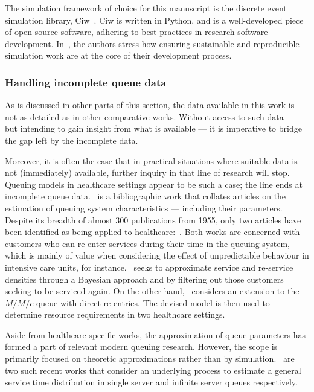 \documentclass[]{interact}
\theoremstyle{plain}%
\theoremstyle{definition}
\theoremstyle{remark}
\begin{document}
The simulation framework of choice for this manuscript is the discrete event
simulation library, Ciw~\citep{Palmer2019}. Ciw is written in Python, and is a
well-developed piece of open-source software, adhering to best practices in
research software development. In~\cite{Palmer2019}, the authors stress how
ensuring sustainable and reproducible simulation work are at the core of their
development process.

\subsubsection{Handling incomplete queue data}

As is discussed in other parts of this section, the data available in this work
is not as detailed as in other comparative works. Without access to such data
--- but intending to gain insight from what is available --- it is
imperative to bridge the gap left by the incomplete data.

Moreover, it is often the case that in practical situations where suitable data
is not (immediately) available, further inquiry in that line of research will
stop. Queuing models in healthcare settings appear to be such a case; the line
ends at incomplete queue data.~\cite{Asanjarani2017} is a bibliographic work
that collates articles on the estimation of queuing system characteristics ---
including their parameters. Despite its breadth of almost 300 publications from
1955, only two articles have been identified as being applied to
healthcare:~\cite{Mohammadi2012,Yom2014}. Both works are concerned with
customers who can re-enter services during their time in the queuing system,
which is mainly of value when considering the effect of unpredictable behaviour
in intensive care units, for instance.~\cite{Mohammadi2012} seeks to approximate
service and re-service densities through a Bayesian approach and by filtering
out those customers seeking to be serviced again. On the other
hand,~\cite{Yom2014} considers an extension to the \(M/M/c\) queue with direct
re-entries. The devised model is then used to determine resource requirements in
two healthcare settings.

Aside from healthcare-specific works, the approximation of queue parameters has
formed a part of relevant modern queuing research. However, the scope is
primarily focused on theoretic approximations rather than by
simulation.~\cite{Djabali2018,Goldenshluger2016} are two such recent works that
consider an underlying process to estimate a general service time distribution
in single server and infinite server queues respectively.
\end{document}
